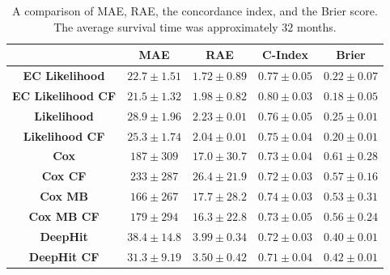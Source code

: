         \begin{table}
            \centering
            
            \captionsetup{singlelinecheck=false, justification=centering}
            \caption{
                A comparison of \gls{MAE}, \gls{RAE}, the concordance index, and the Brier score. The average survival time was approximately $32$ months.
            }
            
            \resizebox*{1.0\linewidth}{!}
            {
                \begin{tabular}{||c|cc|c|c||}
                    \hline
                                                            & \textbf{\gls{MAE}} & \textbf{\gls{RAE}} & \textbf{C-Index}  & \textbf{Brier}    \\
                    \hline
                    \textbf{\gls{EC} Likelihood}            & $22.7\pm1.51$      & $1.72\pm0.89$      & $0.77\pm0.05$     & $0.22\pm0.07$      \\
                    \textbf{\gls{EC} Likelihood \gls{CF}}   & $21.5\pm1.32$      & $1.98\pm0.82$      & $0.80\pm0.03$     & $0.18\pm0.05$      \\
                    \textbf{Likelihood}                    & $28.9\pm1.96$      & $2.23\pm0.01$      & $0.76\pm0.05$     & $0.25\pm0.01$      \\
                    \textbf{Likelihood \gls{CF}}           & $25.3\pm1.74$      & $2.04\pm0.01$      & $0.75\pm0.04$     & $0.20\pm0.01$      \\
                    \hline
                    \textbf{Cox}                           & $187 \pm309 $      & $17.0\pm30.7$      & $0.73\pm0.04$     & $0.61\pm0.28$      \\
                    \textbf{Cox \gls{CF}}                  & $233 \pm287 $      & $26.4\pm21.9$      & $0.72\pm0.03$     & $0.57\pm0.16$      \\
                    \textbf{Cox \gls{MB}}                  & $166 \pm267 $      & $17.7\pm28.2$      & $0.74\pm0.03$     & $0.53\pm0.31$      \\
                    \textbf{Cox \gls{MB} \gls{CF}}         & $179 \pm294 $      & $16.3\pm22.8$      & $0.73\pm0.05$     & $0.56\pm0.24$      \\
                    \hline
                    \textbf{DeepHit}                       & $38.4\pm14.8$      & $3.99\pm0.34$      & $0.72\pm0.03$     & $0.40\pm0.01$      \\
                    \textbf{DeepHit \gls{CF}}              & $31.3\pm9.19$      & $3.50\pm0.42$      & $0.71\pm0.04$     & $0.42\pm0.01$      \\
                    \hline
                \end{tabular}
            }
            \label{tab:deep_learning_for_ct_based_survival_analysis_of_idiopathic_pulmonary_fibrosis_patients_appendix_results_table}
        \end{table}
    
